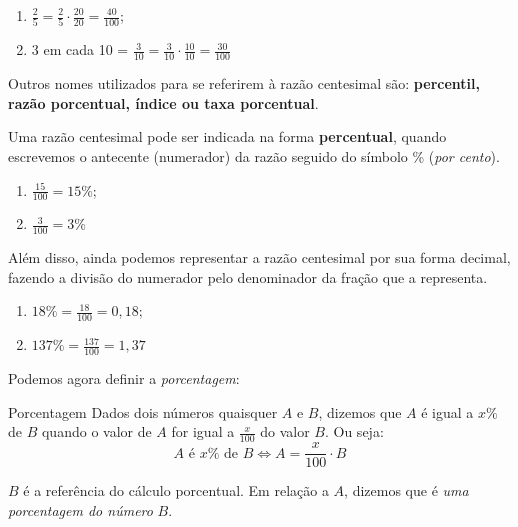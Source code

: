 \documentclass[12pt, a4paper, brazil]{abntex2}
\begin{document}
    \begin{exemplo}
        \hfil\begin{enumerate}[label=(\alph*)]
            \item $\displaystyle \frac{2}{5} = \frac{2}{5} \cdot \frac{20}{20} = \frac{40}{100}$;
            \item 3 em cada 10 = $\displaystyle \frac{3}{10} = \frac{3}{10} \cdot \frac{10}{10}= \frac{30}{100}$
        \end{enumerate}
    \end{exemplo}

    \bigskip
    Outros nomes utilizados para se referirem à razão centesimal são: \textbf{percentil, razão porcentual, índice ou taxa porcentual}.

    Uma razão centesimal pode ser indicada na forma \textbf{percentual}, quando escrevemos o antecente (numerador) da razão seguido do símbolo \% (\textit{por cento}).

    \begin{exemplo}
        \hfil\begin{enumerate}[label= (\alph*)]
            \item $\displaystyle \frac{15}{100} = 15\%$;
            \item $\displaystyle \frac{3}{100} = 3\%$
        \end{enumerate}
    \end{exemplo}
    \bigskip
    Além disso, ainda podemos representar a razão centesimal por sua forma decimal, fazendo a divisão do numerador pelo denominador da fração que a representa.

    \begin{exemplo}
        \hfil\begin{enumerate}[label= (\alph*)]
            \item $\displaystyle 18\% = \frac{18}{100} = 0,18$;
            \item $\displaystyle 137\% = \frac{137}{100}=1,37$
        \end{enumerate}
    \end{exemplo}
    \bigskip

    Podemos agora definir a \textit{porcentagem}:

    \begin{definicao}{Porcentagem}
        Dados dois números quaisquer $A$ e $B$, dizemos que $A$ é igual a $x\%$ de $B$ quando o valor de $A$ for igual a $\frac{x}{100}$ do valor $B$. Ou seja:
            \[
                A \text{ é } x\% \text{ de } B \iff A = \frac{x}{100} \cdot B
            \]

        $B$ é a referência do cálculo porcentual. Em relação a $A$, dizemos que é \textit{uma porcentagem do número} $B$.    
    \end{definicao}
\end{document}

